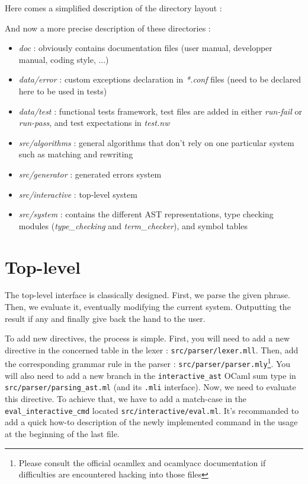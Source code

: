 \documentclass[12pt,a4paper]{article}
\begin{document}
Here comes a simplified description of the directory layout :
\bigskip

\bigskip

And now a more precise description of these directories :

\begin{itemize}

\item \emph{doc} : obviously contains documentation files (user manual, developper manual, coding style, ...)
\item \emph{data/error} : custom exceptions declaration in \emph{*.conf} files (need to be declared here to be used in tests)
\item \emph{data/test} : functional tests framework, test files are added in either \emph{run-fail} or \emph{run-pass}, and test expectations in \emph{test.nw}
\item \emph{src/algorithms} : general algorithms that don't rely on one particular system such as matching and rewriting
\item \emph{src/generator} : generated errors system
\item \emph{src/interactive} : top-level system
\item \emph{src/system} : contains the different AST representations, type checking modules (\emph{type\_checking} and \emph{term\_checker}), and symbol tables

\end{itemize}

\section{Top-level}
\label{top-level}

The top-level interface is classically designed. First, we parse the
given phrase. Then, we evaluate it, eventually modifying the current
system. Outputting the result if any and finally give back the hand to
the user. 

\bigskip
To add new directives, the process is simple. First, you will need to
add a new directive in the concerned table in the lexer :
\verb?src/parser/lexer.mll?. Then, add the corresponding grammar rule
in the parser : \verb?src/parser/parser.mly?\footnote{Please consult
  the official ocamllex and ocamlyacc documentation if difficulties
  are encountered hacking into those files}. You will also need to add
a new branch in the \verb?interactive_ast? OCaml sum type in
\verb?src/parser/parsing_ast.ml? (and its \verb?.mli? interface). Now,
we need to evaluate this directive. To achieve that, we have to add a
match-case in the \verb?eval_interactive_cmd? located
\verb?src/interactive/eval.ml?. It's recommanded to add a quick how-to
description of the newly implemented command in the usage at the
beginning of the last file. 
\end{document}
